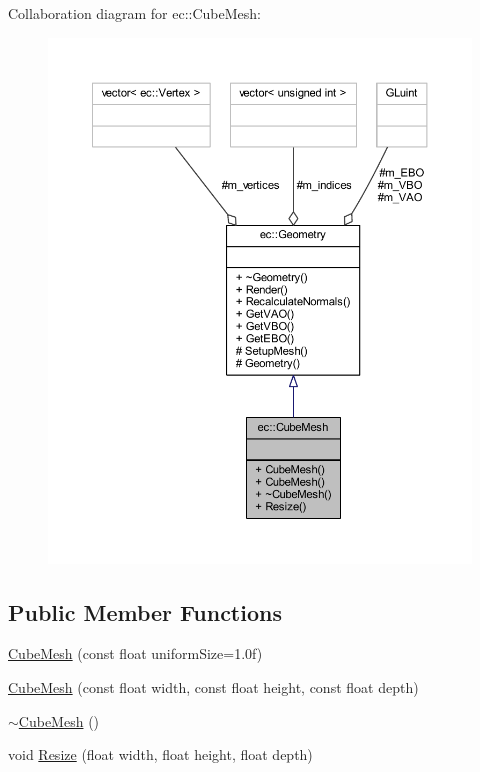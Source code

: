 Collaboration diagram for ec\+:\+:Cube\+Mesh\+:
\nopagebreak
\begin{figure}[H]
\begin{center}
\leavevmode
\includegraphics[width=350pt]{classec_1_1_cube_mesh__coll__graph}
\end{center}
\end{figure}
\subsection*{Public Member Functions}
\begin{DoxyCompactItemize}
\item 
\mbox{\hyperlink{classec_1_1_cube_mesh_ac7a03d63c5e3f57ef94e5d18098b4a03}{Cube\+Mesh}} (const float uniform\+Size=1.\+0f)
\item 
\mbox{\hyperlink{classec_1_1_cube_mesh_a645d007818631c7ab01c4725ec6818a6}{Cube\+Mesh}} (const float width, const float height, const float depth)
\item 
\mbox{\hyperlink{classec_1_1_cube_mesh_a59af4189ee0c7fa24e2bd239acc6589d}{$\sim$\+Cube\+Mesh}} ()
\item 
void \mbox{\hyperlink{classec_1_1_cube_mesh_a4c2538e7fa1de0ea96c794ae3bc6e1d7}{Resize}} (float width, float height, float depth)
\end{DoxyCompactItemize}
